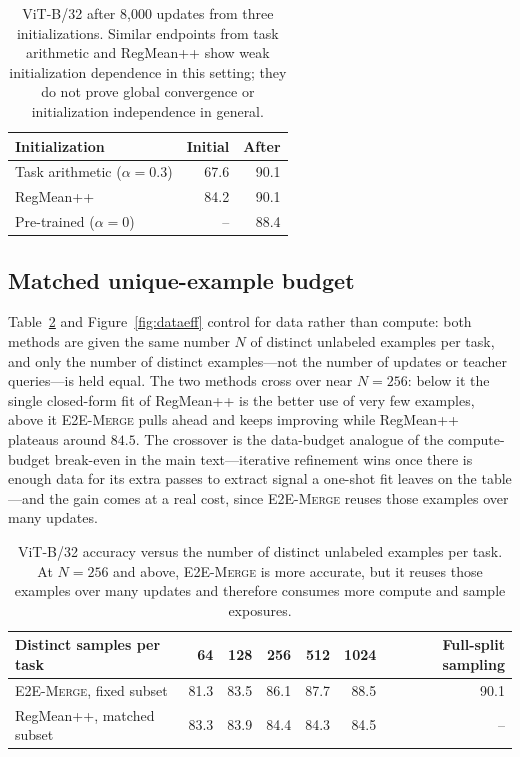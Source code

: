 \documentclass[letterpaper]{article} %
\newcommand{\method}{\textup{\textsc{E2E-Merge}}\xspace}
\theoremstyle{plain}
\theoremstyle{definition}
\begin{document}
\begin{table}[tb]
\centering
{\small
\begin{tabular*}{\columnwidth}{@{\extracolsep{\fill}}lrr}
\toprule
Initialization & Initial & After \\
\midrule
Task arithmetic ($\alpha=0.3$) & 67.6 & 90.1 \\
RegMean++ & 84.2 & 90.1 \\
Pre-trained ($\alpha=0$) & -- & 88.4 \\
\bottomrule
\end{tabular*}
}
\caption{ViT-B/32 after 8,000 updates from three initializations. Similar endpoints from
task arithmetic and RegMean++ show weak initialization dependence in this setting; they do not prove global convergence or initialization independence in general.}
\label{tab:refiner}
\end{table}

\subsection{Matched unique-example budget}
\label{app:sample-budget}
Table~\ref{tab:sample-budget} and Figure~\ref{fig:dataeff} control for data rather than compute: both methods are given the same number $N$ of distinct unlabeled examples per task, and only the number of distinct examples---not the number of updates or teacher queries---is held equal.
The two methods cross over near $N=256$: below it the single closed-form fit of RegMean++ is the better use of very few examples, above it \method pulls ahead and keeps improving while RegMean++ plateaus around $84.5$.
The crossover is the data-budget analogue of the compute-budget break-even in the main text---iterative refinement wins once there is enough data for its extra passes to extract signal a one-shot fit leaves on the table---and the gain comes at a real cost, since \method reuses those examples over many updates.

\begin{table}[tb]
\centering
{\small
\begin{tabular}{lrrrrrr}
\toprule
Distinct samples per task & 64 & 128 & 256 & 512 & 1024 & Full-split sampling \\
\midrule
\method, fixed subset & 81.3 & 83.5 & 86.1 & 87.7 & 88.5 & 90.1 \\
RegMean++, matched subset & 83.3 & 83.9 & 84.4 & 84.3 & 84.5 & -- \\
\bottomrule
\end{tabular}
}
\caption{ViT-B/32 accuracy versus the number of distinct unlabeled examples per task.
At $N=256$ and above, \method is more accurate, but it reuses those examples over many updates and therefore consumes more compute and sample exposures.}
\label{tab:sample-budget}
\end{table}
\end{document}
